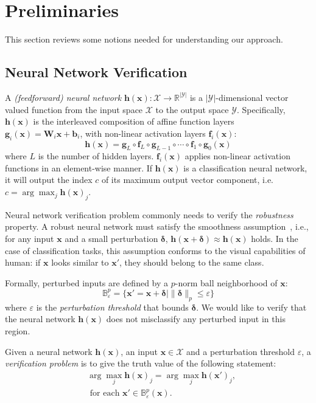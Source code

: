 \documentclass[runningheads]{llncs}
\newcommand{\myvec}[1]{\boldsymbol{#1}}
\newcommand{\mymatrix}[1]{\boldsymbol{#1}}
\newcommand{\comp}{\mathrel{\circ}}
\begin{document}
%
%
%

\section{Preliminaries}
\label{sec:pre}
This section reviews some notions needed for understanding our approach.


\subsection{Neural Network Verification}
A \emph{(feedforward) neural network} $\myvec{h}(\myvec{x}): \mathcal{X} \to
\mathbb{R}^{|\mathcal{Y}|}$ is a $|\mathcal{Y}|$-dimensional vector
valued function from the input space $\mathcal{X}$ to the output space
$\mathcal{Y}$.  Specifically, $\myvec{h}(\myvec{x})$ is the
interleaved composition of affine function layers
$\myvec{g}_i(\myvec{x})=\mymatrix{W}_i\myvec{x}+\myvec{b}_i$, with
non-linear activation layers $\myvec{f}_i(\myvec{x})$:
\[
\myvec{h}(\myvec{x}) = \myvec{g}_{L} \comp \myvec{f}_{L} \comp
\myvec{g}_{L-1} \comp \cdots \comp \myvec{f}_{1} \comp
\myvec{g}_{0}(\myvec{x})
\]
where $L$ is the number of hidden layers. 
$\myvec{f}_i(\myvec{x})$ applies non-linear activation functions in an element-wise manner. 
If $\myvec{h}(\myvec{x})$ is a classification neural network, it will
output the index $c$ of its maximum output vector component, i.e. $c =
\arg \max_{j} \myvec{h}(\myvec{x})_{j}$.

Neural network verification problem commonly needs to verify the
\emph{robustness} property.  A robust neural network must satisfy the
smoothness assumption~\cite{DBLP:books/daglib/0040158}, i.e., for any
input $\myvec{x}$ and a small perturbation $\myvec{\delta}$,
$\myvec{h}(\myvec{x} + \myvec{\delta}) \approx \myvec{h}(\myvec{x})$
holds. In the case of classification tasks, this assumption conforms
to the visual capabilities of human: if $\myvec{x}$ looks similar to
$\myvec{x}'$, they should belong to the same class.

Formally, perturbed inputs are defined by a $p$-norm ball neighborhood
of $\myvec{x}$:
\[
\mathbb{B}^{p}_{\varepsilon} = \{\myvec{x}' = \myvec{x}
+ \myvec{\delta} \mid \|\myvec{\delta}\|_{p} \leq \varepsilon\}
\]
where $\varepsilon$ is the \emph{perturbation threshold} that bounds
$\myvec{\delta}$. We would like to verify that the neural network
$\myvec{h}(\myvec{x})$ does not misclassify any perturbed input in
this region.

\begin{definition}
Given a neural network $\myvec{h}(\myvec{x})$, an input
$\myvec{x}\in\mathcal{X}$ and a perturbation threshold $\varepsilon$, a
\emph{verification problem} is to give the truth value of the
following statement:
\begin{equation}
\begin{aligned}
  &\arg \max_{j} \myvec{h}(\myvec{x})_{j} = \arg \max_{j}
  \myvec{h}(\myvec{x}')_{j},\\
 &\mbox{ for each } \myvec{x}' \in
  \mathbb{B}^{p}_{\varepsilon}(\myvec{x}).\nonumber
\end{aligned}
\end{equation}
\end{definition}
\end{document}

